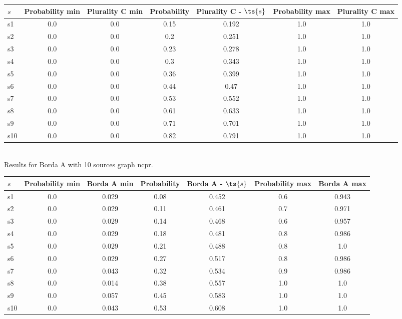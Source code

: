 \documentclass{article}
\begin{document}
\noindent\begin{tabular}{|l|c|c|c|c|c|c|}
\hline
$s$& Probability min & Plurality C min & Probability & Plurality C - $\ts{s}$ & Probability max & Plurality C max\\
\hline
s1 &0.0 & 0.0 & 0.15 & 0.192 & 1.0 & 1.0\\
\hline
s2 &0.0 & 0.0 & 0.2 & 0.251 & 1.0 & 1.0\\
\hline
s3 &0.0 & 0.0 & 0.23 & 0.278 & 1.0 & 1.0\\
\hline
s4 &0.0 & 0.0 & 0.3 & 0.343 & 1.0 & 1.0\\
\hline
s5 &0.0 & 0.0 & 0.36 & 0.399 & 1.0 & 1.0\\
\hline
s6 &0.0 & 0.0 & 0.44 & 0.47 & 1.0 & 1.0\\
\hline
s7 &0.0 & 0.0 & 0.53 & 0.552 & 1.0 & 1.0\\
\hline
s8 &0.0 & 0.0 & 0.61 & 0.633 & 1.0 & 1.0\\
\hline
s9 &0.0 & 0.0 & 0.71 & 0.701 & 1.0 & 1.0\\
\hline
s10 &0.0 & 0.0 & 0.82 & 0.791 & 1.0 & 1.0\\
\hline
\end{tabular}\\

\noindent Results for Borda A with 10 sources graph ncpr.

\noindent\begin{tabular}{|l|c|c|c|c|c|c|}
\hline
$s$& Probability min & Borda A min & Probability & Borda A - $\ts{s}$ & Probability max & Borda A max\\
\hline
s1 &0.0 & 0.029 & 0.08 & 0.452 & 0.6 & 0.943\\
\hline
s2 &0.0 & 0.029 & 0.11 & 0.461 & 0.7 & 0.971\\
\hline
s3 &0.0 & 0.029 & 0.14 & 0.468 & 0.6 & 0.957\\
\hline
s4 &0.0 & 0.029 & 0.18 & 0.481 & 0.8 & 0.986\\
\hline
s5 &0.0 & 0.029 & 0.21 & 0.488 & 0.8 & 1.0\\
\hline
s6 &0.0 & 0.029 & 0.27 & 0.517 & 0.8 & 0.986\\
\hline
s7 &0.0 & 0.043 & 0.32 & 0.534 & 0.9 & 0.986\\
\hline
s8 &0.0 & 0.014 & 0.38 & 0.557 & 1.0 & 1.0\\
\hline
s9 &0.0 & 0.057 & 0.45 & 0.583 & 1.0 & 1.0\\
\hline
s10 &0.0 & 0.043 & 0.53 & 0.608 & 1.0 & 1.0\\
\hline
\end{tabular}\\
\end{document}
